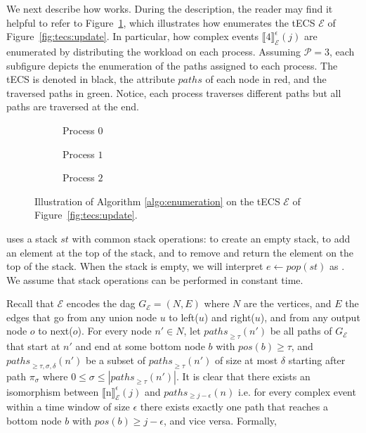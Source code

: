 We next describe how  works. During the description, the reader may find it helpful to refer to Figure~\ref{fig:tecs:enumeration}, which illustrates how  enumerates the tECS $\mathcal{E}$ of Figure~\ref{fig:tecs:update}. In particular, how complex events ${\llbracket \text{4} \rrbracket}^{\epsilon}_{\mathcal{E}}(j)$ are enumerated by distributing the workload on each process. Assuming $\mathcal{P} = 3$, each subfigure depicts the enumeration of the paths assigned to each process. The tECS is denoted in black, the attribute $paths$ of each node in red, and the traversed paths in green. Notice, each process traverses different paths but all paths are traversed at the end.

\begin{figure}[h]
  \centering
  \begin{subfigure}[b]{0.3\linewidth}
    \centering
    \caption{Process $0$}
  \end{subfigure}
  \hfill
  \begin{subfigure}[b]{0.3\linewidth}
    \centering
    \caption{Process $1$}
  \end{subfigure}
  \hfill
  \begin{subfigure}[b]{0.3\linewidth}
    \centering
    \caption{Process $2$}
  \end{subfigure}

  \caption{Illustration of Algorithm \ref{algo:enumeration} on the tECS $\mathcal{E}$ of Figure~\ref{fig:tecs:update}.}
  \label{fig:tecs:enumeration}
\end{figure}

 uses a stack $st$ with common stack operations:  to create an empty stack,  to add an element  at the top of the stack, and  to remove and return the element on the top of the stack. When the stack is empty, we will interpret $e \leftarrow pop(st)$ as . We assume that stack operations can be performed in constant time.

Recall that $\mathcal{E}$ encodes the \acrshort{dag} $G_{\mathcal{E}} = (N, E)$ where $N$ are the vertices, and $E$ the edges that go from any union node $u$ to left($u$) and right($u$), and from any output node $o$ to next($o$). For every node $n' \in N$, let ${paths}_{\ge \tau}(n')$ be all paths of $G_{\mathcal{E}}$ that start at $n'$ and end at some bottom node $b$ with $pos(b) \ge \tau$, and ${paths}_{\ge \tau, \sigma, \delta}(n')$ be a subset of ${paths}_{\ge \tau}(n')$ of size at most $\delta$ starting after path $\pi_{\sigma}$ where $0 \le \sigma \le |{paths}_{\ge \tau}(n')|$. It is clear that there exists an isomorphism between ${\llbracket \text{n} \rrbracket}^{\epsilon}_{\mathcal{E}}(j)$ and $paths_{\ge j - \epsilon}(n)$ i.e. for every complex event within a time window of size $\epsilon$ there exists exactly one path that reaches a bottom node $b$ with $pos(b) \ge j - \epsilon$, and vice versa. Formally,

